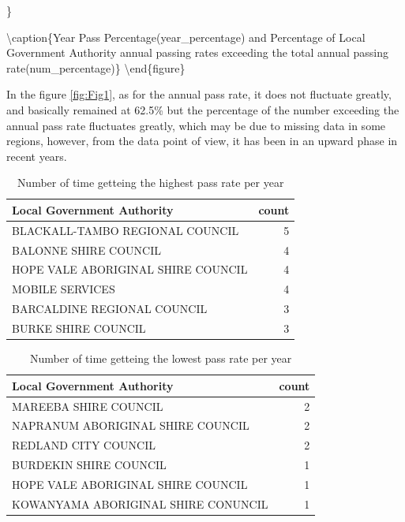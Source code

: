\documentclass[11pt,a4paper,]{article}
\begin{document}
\}

\textbackslash caption\{Year Pass Percentage(year\_percentage) and Percentage of Local Government Authority annual passing rates exceeding the total annual passing rate(num\_percentage)\}\label{fig:Fig1}
\textbackslash end\{figure\}

In the figure \ref{fig:Fig1}, as for the annual pass rate, it does not fluctuate greatly, and basically remained at 62.5\% but the percentage of the number exceeding the annual pass rate fluctuates greatly, which may be due to missing data in some regions, however, from the data point of view, it has been in an upward phase in recent years.

\begin{table}

\caption{\label{tab:Tab1}Number of time getteing the highest pass rate per year}
\centering
\begin{tabular}[t]{lr}
\toprule
Local Government Authority & count\\
\midrule
BLACKALL-TAMBO REGIONAL COUNCIL & 5\\
BALONNE SHIRE COUNCIL & 4\\
HOPE VALE ABORIGINAL SHIRE COUNCIL & 4\\
MOBILE SERVICES & 4\\
BARCALDINE REGIONAL COUNCIL & 3\\
\addlinespace
BURKE SHIRE COUNCIL & 3\\
\bottomrule
\end{tabular}
\end{table}

\begin{table}

\caption{\label{tab:Tab2}Number of time getteing the lowest pass rate per year}
\centering
\begin{tabular}[t]{lr}
\toprule
Local Government Authority & count\\
\midrule
MAREEBA SHIRE COUNCIL & 2\\
NAPRANUM ABORIGINAL SHIRE COUNCIL & 2\\
REDLAND CITY COUNCIL & 2\\
BURDEKIN SHIRE COUNCIL & 1\\
HOPE VALE ABORIGINAL SHIRE COUNCIL & 1\\
\addlinespace
KOWANYAMA ABORIGINAL SHIRE CONUNCIL & 1\\
\bottomrule
\end{tabular}
\end{table}
\end{document}
